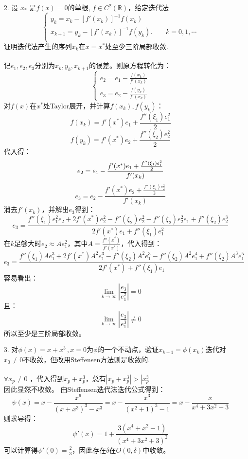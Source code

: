 \documentclass{article}
\begin{document}
\begin{itemize}
		\item[2.] 设 $x_*$ 是$f(x) = 0$的单根, $f \in C^2(\mathbb{R}) $，给定迭代法
		$$
			\left\{
			\begin{array}{lcl}
				y_k = x_k - [f'(x_k)]^{-1}f(x_k)\\
				x_{k+1} = y_k-[f'(x_k)]^{-1}f(y_k). \qquad k=0,1,\cdots\\
			\end{array}
			\right.
		$$
		证明迭代法产生的序列${x_k}$在$x= x^*$处至少三阶局部收敛.\\
		\\
		记$e_1,e_2,e_3$分别为$x_k, y_k, x_{k+1}$的误差。则原方程转化为：
		$$
			\left\{
				\begin{array}{lcl}
					e_2 = e_1 - \frac{f(x_k)}{f'(x_k)}\\
					e_3 = e_2 - \frac{f(y_k)}{f'(x_k)}
				\end{array}
			\right.
		$$
		对$f(x)$在$x^*$处Taylor展开，并计算$f(x_k),f(y_k)$：\\
		$$
			f(x_k) = f'(x^*)e_1 + \frac{f''(\xi_1)e_1^2}{2}
		$$
		$$
			f(y_k) = f'(x^*)e_2 + \frac{f''(\xi_2)e_2^2}{2}
		$$
		代入得：
		$$
			e_2 = e_1 - \frac{f'(x^*)e_1 + \frac{f''(\xi_1)e_1^2}{2}}{f'(x_k)}\\
		$$
		$$
			e_3 = e_2 - \frac{ f'(x^*)e_2 + \frac{f''(\xi_2)e_2^2}{2}}{f'(x_k)}
		$$
		消去$f'(x_k)$，并解出$e_3$得到：
		$$
			e_3 = \frac{f''(\xi_1)e_1^2e_2 + 2f'(x^*)e_2^2 - f''(\xi_2)e_2^2 - f''(\xi_2)e_2^2e_1 +f''(\xi_2)e_2^3}{2f'(x^*)e_1 +f''(\xi_1)e_1^2}
		$$
		在$k$足够大时$e_2 \approx Ae_1^2$，其中$A = \frac{f''(x^*)}{f'(x^*)}$，代入得到：
		$$	
				e_3 = \frac{f''(\xi_1)Ae_1^3 + 2f'(x^*)A^2e_1^3 - f''(\xi_2)A^2e_1^3 - f''(\xi_2)A^2e_1^4 +f''(\xi_2)A^3e_1^5}{2f'(x^*) +f''(\xi_1)e_1}
		$$
		容易看出：
		$$
			\lim\limits_{k\rightarrow\infty}\left|\frac{e_3}{e_1^2}\right| = 0
		$$
		且：
		$$
			\lim\limits_{k\rightarrow\infty}\left|\frac{e_3}{e_1^3}\right| \ne 0
		$$
		所以至少是三阶局部收敛。\\
		
		\item [3.]对$\phi(x) = x+ x^3\,,x = 0$为$\phi$的一个不动点，验证$x_{k+1} = \phi(x_k)$迭代对$x_0\ne0$不收敛，但改用Steffensen方法则是收敛的.\\
		\\
		$\forall x_p \ne 0$	，代入得到$x_p +x_p^3$，总有$|x_p + x_p^3| > |x_p^3|$\\
		因此显然不收敛。
		由Steffensen迭代法迭代公式得到：
		$$	
			\psi(x) = x - \frac{x^6}{(x+x^3)^3 -x^3} = x - \frac{x^3}{(x^2 + 1)^3 - 1} = x - \frac{x}{x^4 + 3x^2 +3}
		$$
		则求导得：
		$$\psi'(x) = 1 +\frac{3(x^4 + x^2 - 1)}{(x^4 + 3x^2 +3)^2}$$
		可以计算得$\psi'(0) = \frac{2}{3}$，因此存在$\delta$在$O(0, \delta)$中收敛。\\
		\\
		

\end{itemize}
\end{document}
